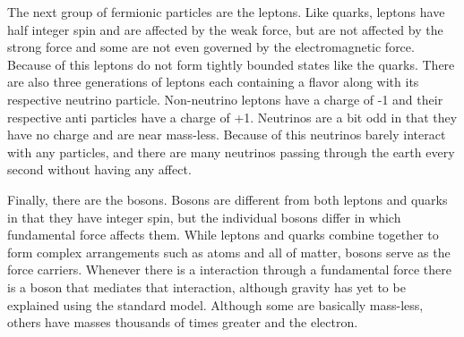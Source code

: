 The next group of fermionic particles are the leptons. Like quarks, leptons have half integer spin and are affected by the weak force, but are not affected by the strong force and some are not even governed by the electromagnetic force. Because of this leptons do not form tightly bounded states like the quarks. There are also three generations of leptons each containing a flavor along with its respective neutrino particle. Non-neutrino leptons have a charge of -1 and their respective anti particles have a charge of +1. Neutrinos are a bit odd in that they have no charge and are near mass-less. Because of this neutrinos barely interact with any particles, and there are many neutrinos passing through the earth every second without having any affect.

Finally, there are the bosons. Bosons are different from both leptons and quarks in that they have integer spin, but the individual bosons differ in which fundamental force affects them. While leptons and quarks combine together to form complex arrangements such as atoms and all of matter, bosons serve as the force carriers. Whenever there is a interaction through a fundamental force there is a boson that mediates that interaction, although gravity has yet to be explained using the standard model. Although some are basically mass-less, others have masses thousands of times greater and the electron. 

